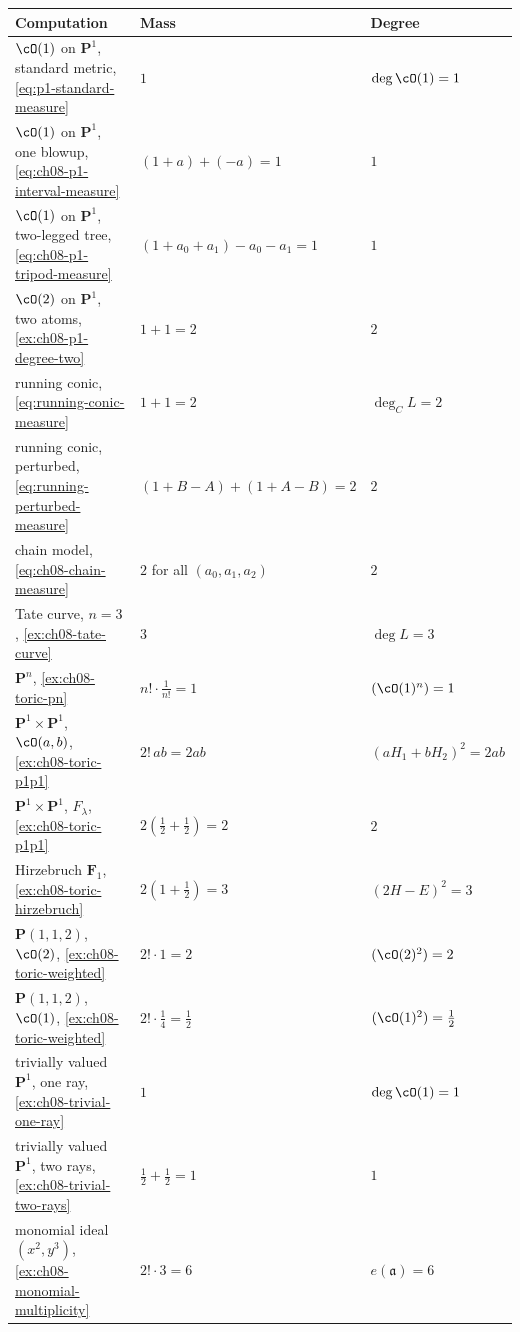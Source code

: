 \begin{center}
\small
\begin{tabular}{p{}|p{}|p{}}
\textbf{Computation}&\textbf{Mass}&\textbf{Degree}\\ \hline
$\cO(1)$ on $\mathbf P^1$, standard metric,
  \eqref{eq:p1-standard-measure}
  &$1$&$\deg\cO(1)=1$\\
$\cO(1)$ on $\mathbf P^1$, one blowup,
  \eqref{eq:ch08-p1-interval-measure}
  &$(1+a)+(-a)=1$&$1$\\
$\cO(1)$ on $\mathbf P^1$, two-legged tree,
  \eqref{eq:ch08-p1-tripod-measure}
  &$(1+a_0+a_1)-a_0-a_1=1$&$1$\\
$\cO(2)$ on $\mathbf P^1$, two atoms,
  \cref{ex:ch08-p1-degree-two}
  &$1+1=2$&$2$\\
running conic, \eqref{eq:running-conic-measure}
  &$1+1=2$&$\deg_C L=2$\\
running conic, perturbed,
  \eqref{eq:running-perturbed-measure}
  &$(1+B-A)+(1+A-B)=2$&$2$\\
chain model, \eqref{eq:ch08-chain-measure}
  &$2$ for all $(a_0,a_1,a_2)$&$2$\\
Tate curve, $n=3$, \cref{ex:ch08-tate-curve}
  &$3$&$\deg L=3$\\
$\mathbf P^n$, \cref{ex:ch08-toric-pn}
  &$n!\cdot\tfrac1{n!}=1$&$(\cO(1)^n)=1$\\
$\mathbf P^1\times\mathbf P^1$, $\cO(a,b)$,
  \cref{ex:ch08-toric-p1p1}
  &$2!\,ab=2ab$&$(aH_1+bH_2)^2=2ab$\\
$\mathbf P^1\times\mathbf P^1$, $F_\lambda$,
  \cref{ex:ch08-toric-p1p1}
  &$2(\tfrac12+\tfrac12)=2$&$2$\\
Hirzebruch $\mathbf F_1$, \cref{ex:ch08-toric-hirzebruch}
  &$2(1+\tfrac12)=3$&$(2H-E)^2=3$\\
$\mathbf P(1,1,2)$, $\cO(2)$,
  \cref{ex:ch08-toric-weighted}
  &$2!\cdot1=2$&$(\cO(2)^2)=2$\\
$\mathbf P(1,1,2)$, $\cO(1)$,
  \cref{ex:ch08-toric-weighted}
  &$2!\cdot\tfrac14=\tfrac12$&$(\cO(1)^2)=\tfrac12$\\
trivially valued $\mathbf P^1$, one ray,
  \cref{ex:ch08-trivial-one-ray}
  &$1$&$\deg\cO(1)=1$\\
trivially valued $\mathbf P^1$, two rays,
  \cref{ex:ch08-trivial-two-rays}
  &$\tfrac12+\tfrac12=1$&$1$\\
monomial ideal $(x^2,y^3)$,
  \cref{ex:ch08-monomial-multiplicity}
  &$2!\cdot3=6$&$e(\mathfrak a)=6$
\end{tabular}
\end{center}


